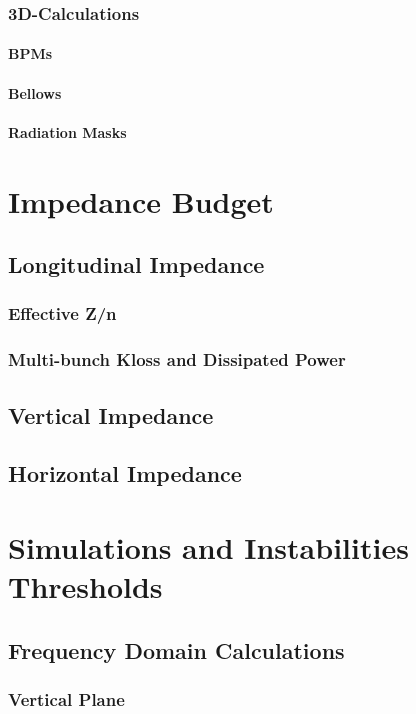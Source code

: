 \documentclass[
	12pt,				%
	openright,			%
	oneside,			%
	a4paper,		%
	chapter=TITLE,		%
	section=TITLE,		%
    brazil,				%
	english,			%
	sumario=tradicional,
	]{abntex2}
\begin{document}
      \subsubsection{3D-Calculations}
        \paragraph{BPMs}
        \paragraph{Bellows}
        \paragraph{Radiation Masks}
    \subsection{}
  \section{Impedance Budget}
    \subsection{Longitudinal Impedance}
      \subsubsection{Effective Z/n}
      \subsubsection{Multi-bunch Kloss and Dissipated Power}
    \subsection{Vertical Impedance}
    \subsection{Horizontal Impedance}
  \section{Simulations and Instabilities Thresholds}
    \subsection{Frequency Domain Calculations}
      \subsubsection{Vertical Plane}
\end{document}
